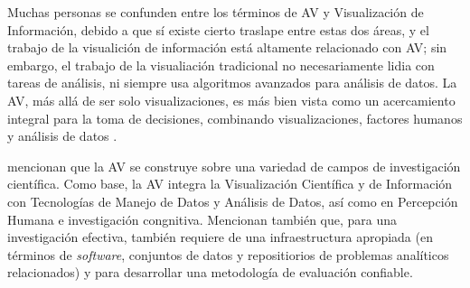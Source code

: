 Muchas personas se confunden entre los términos de AV y Visualización de Información, debido a que sí existe cierto traslape entre estas dos áreas, y el trabajo de la visualición de información está altamente relacionado con AV; sin embargo, el trabajo de la visualiación tradicional no necesariamente lidia con tareas de análisis, ni siempre usa algoritmos avanzados para análisis de datos. La AV, más allá de ser solo visualizaciones, es más bien vista como un acercamiento integral para la toma de decisiones, combinando visualizaciones, factores humanos y análisis de datos \citep{Keim2008}.

\cite{Keim2008} mencionan que la AV se construye sobre una variedad de campos de investigación científica. Como base, la AV integra la Visualización Científica y de Información con Tecnologías de Manejo de Datos y Análisis de Datos, así como en Percepción Humana e investigación congnitiva. Mencionan también que, para una investigación efectiva, también requiere de una infraestructura apropiada (en términos de \textit{software}, conjuntos de datos y repositiorios de problemas analíticos relacionados) y para desarrollar una metodología de evaluación confiable.